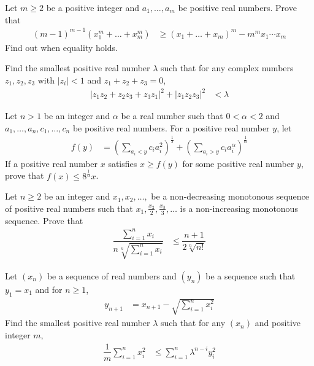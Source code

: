 \documentclass{subfile}
\begin{document}
		\begin{problem}
			Let $m\geq2$ be a positive integer and $a_{1},\ldots,a_{m}$ be positive real numbers. Prove that
				\begin{align*}
					(m-1)^{m-1}\left(x_{1}^{m}+\ldots+x_{m}^{m}\right)
						& \geq (x_{1}+\ldots+x_{m})^{m}-m^{m}x_{1}\cdots x_{m}
				\end{align*}
			Find out when equality holds.
		\end{problem}
	
		\begin{problem}
			Find the smallest positive real number $\lambda$ such that for any complex numbers $z_{1},z_{2},z_{3}$ with $|z_{i}|<1$ and $z_{1}+z_{2}+z_{3}=0$,
				\begin{align*}
					|z_{1}z_{2}+z_{2}z_{3}+z_{3}z_{1}|^{2}+|z_{1}z_{2}z_{3}|^{2}
						& < \lambda
				\end{align*}
		\end{problem}
	
		\begin{problem}
			Let $n>1$ be an integer and $\alpha$ be a real number such that $0<\alpha<2$ and $a_{1},\ldots,a_{n},c_{1},\ldots,c_{n}$ be positive real numbers. For a positive real number $y$, let
				\begin{align*}
					f(y)
						& = \left(\sum_{a_{i}<y}c_{i}a_{i}^{2}\right)^{\frac{1}{2}}+\left(\sum_{a_{i}>y}c_{i}a_{i}^{\alpha}\right)^{\frac{1}{\alpha}}
				\end{align*}
			If a positive real number $x$ satisfies $x\geq f(y)$ for some positive real number $y$, prove that $f(x)\leq 8^{\frac{1}{\alpha}}x$.
		\end{problem}
	
		\begin{problem}
			Let $n\geq2$ be an integer and $x_{1},x_{2},\ldots,$ be a non-decreasing monotonous sequence of positive real numbers such that $x_{1},\frac{x_{2}}{2},\frac{x_{3}}{3},\ldots$ is a non-increasing monotonous sequence. Prove that
				\begin{align*}
					\dfrac{\sum_{i=1}^{n}x_{i}}{n\sqrt[n]{\sum_{i=1}^{n}x_{i}}}
						& \leq \dfrac{n+1}{2\sqrt[n]{n!}}
				\end{align*} 
		\end{problem}
	
		\begin{problem}
			Let $(x_{n})$ be a sequence of real numbers and $(y_{n})$ be a sequence such that $y_{1}=x_{1}$ and for $n\geq1$,
				\begin{align*}
					y_{n+1}
						& = x_{n+1}-\sqrt{\sum_{i=1}^{n}x_{i}^{2}}
				\end{align*}
			Find the smallest positive real number $\lambda$ such that for any $(x_{n})$ and positive integer $m$,
				\begin{align*}
					\dfrac{1}{m}\sum_{i=1}^{n}x_{i}^{2}
						& \leq \sum_{i=1}^{n}\lambda^{n-i}y_{i}^{2}
				\end{align*}
		\end{problem}
	
\end{document}
